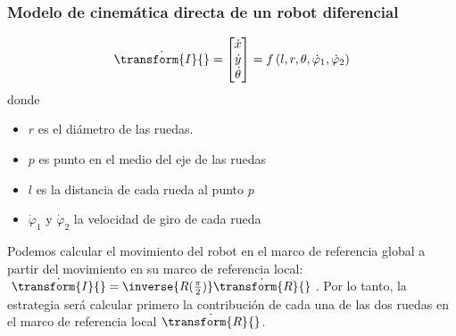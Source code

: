 \begin{frame}
    \frametitle{Modelo de cinemática directa de un robot diferencial}
    \footnotesize
    \begin{figure}[!h]
        \centering
    \end{figure}

    \begin{equation*}
        \dot{\transform{I}{}} =
        \begin{bmatrix}
            \dot{x}\\
            \dot{y}\\
            \dot{\theta}
        \end{bmatrix} =
        f\left( l,r,\theta,\dot{\varphi}_{1},\dot{\varphi}_{2}\right)
    \end{equation*}
    donde
    \begin{itemize}
        \item $r$ es el diámetro de las ruedas.
        \item $p$ es punto en el medio del eje de las ruedas
        \item $l$ es la distancia de cada rueda al punto $p$
        \item $\dot{\varphi}_{1}$ y $\dot{\varphi}_{2}$ la velocidad de giro de cada rueda
    \end{itemize}

    Podemos calcular el movimiento del robot en el marco de referencia global a partir del movimiento en su marco de referencia local:  $\dot{\transform{I}{}} = \inverse{R(\frac{\pi}{2})}\dot{\transform{R}{}}$. Por lo tanto, la estrategia será calcular primero la contribución de cada una de las dos ruedas en el marco de referencia local $\dot{\transform{R}{}}$.
\end{frame}

